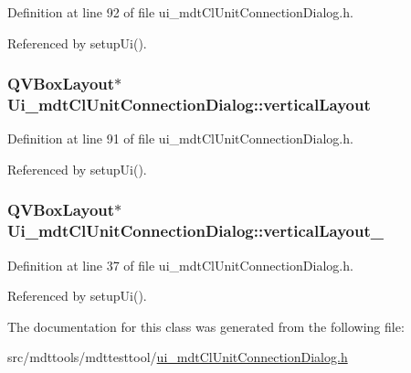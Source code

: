 Definition at line 92 of file ui\-\_\-mdt\-Cl\-Unit\-Connection\-Dialog.\-h.



Referenced by setup\-Ui().

\hypertarget{class_ui__mdt_cl_unit_connection_dialog_ab6f167890b806b8c9cd7eaaa7a172cae}{
\subsubsection[{vertical\-Layout}]{\setlength{\rightskip}{0pt plus 5cm}Q\-V\-Box\-Layout$\ast$ Ui\-\_\-mdt\-Cl\-Unit\-Connection\-Dialog\-::vertical\-Layout}}\label{class_ui__mdt_cl_unit_connection_dialog_ab6f167890b806b8c9cd7eaaa7a172cae}


Definition at line 91 of file ui\-\_\-mdt\-Cl\-Unit\-Connection\-Dialog.\-h.



Referenced by setup\-Ui().

\hypertarget{class_ui__mdt_cl_unit_connection_dialog_a31fda17e7cfe22d3702872856200633a}{
\subsubsection[{vertical\-Layout\-\_\-2}]{\setlength{\rightskip}{0pt plus 5cm}Q\-V\-Box\-Layout$\ast$ Ui\-\_\-mdt\-Cl\-Unit\-Connection\-Dialog\-::vertical\-Layout\-\_}}\label{class_ui__mdt_cl_unit_connection_dialog_a31fda17e7cfe22d3702872856200633a}


Definition at line 37 of file ui\-\_\-mdt\-Cl\-Unit\-Connection\-Dialog.\-h.



Referenced by setup\-Ui().



The documentation for this class was generated from the following file\-:\begin{DoxyCompactItemize}
\item 
src/mdttools/mdttesttool/\hyperlink{ui__mdt_cl_unit_connection_dialog_8h}{ui\-\_\-mdt\-Cl\-Unit\-Connection\-Dialog.\-h}\end{DoxyCompactItemize}
